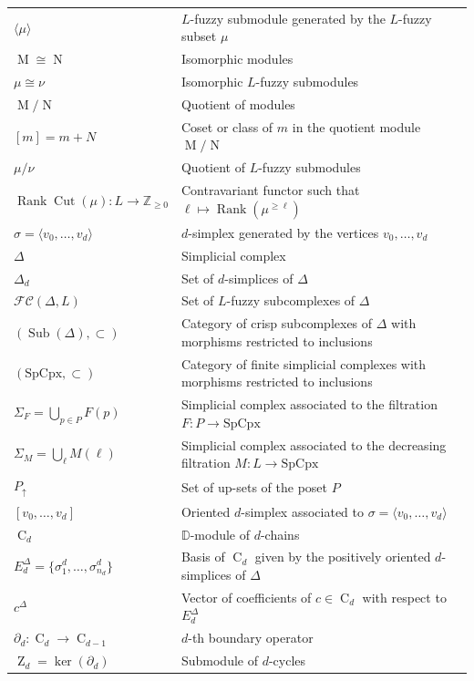 \documentclass[a4paper,10pt]{article}
\newcommand{\bbd}{\mathbb{D}}
\newcommand{\bbz}{\mathbb{Z}}
\newcommand{\calfc}{\mathcal{FC}}
\DeclareMathOperator{\rank}{Rank}
\DeclareMathOperator{\cut}{Cut}
\DeclareMathOperator{\sub}{Sub}
\newcommand{\SpCpx}{\textrm{SpCpx}}
\DeclareMathOperator{\Mo}{M}
\DeclareMathOperator{\No}{N}
\DeclareMathOperator{\Co}{C}
\DeclareMathOperator{\Zo}{Z}
\begin{document}
\begin{longtable}{l|l}
\(\langle \mu \rangle\) & \(L\)-fuzzy submodule generated by the \(L\)-fuzzy subset \(\mu\) \\
\(\Mo \cong \No\) & Isomorphic modules \\
\(\mu \cong \nu\) & Isomorphic \(L\)-fuzzy submodules \\
\(\Mo/\No\) & Quotient of modules \\
\([m]=m + N\) & Coset or class of \(m\) in the quotient module \(\Mo / \No\) \\
\(\mu/\nu\) & Quotient of \(L\)-fuzzy submodules \\
\(\rank\!\cut(\mu): L \to \bbz_{\geq 0}\) & Contravariant functor such that \(\ell \mapsto \rank(\mu^{\geq \ell})\) \\
\(\sigma = \langle v_0,\dots,v_d \rangle\) & \(d\)-simplex generated by the vertices \(v_0,\dots,v_d\) \\
\(\Delta\) & Simplicial complex \\
\(\Delta_d\) & Set of \(d\)-simplices of \(\Delta\) \\
\(\calfc(\Delta,L)\) & Set of \(L\)-fuzzy subcomplexes of \(\Delta\) \\
\((\sub(\Delta),\subset)\) & Category of crisp subcomplexes of \(\Delta\) with morphisms restricted to inclusions \\
\((\SpCpx,\subset)\) & Category of finite simplicial complexes with morphisms restricted to inclusions \\
\(\Sigma_F=\bigcup_{p \in P}F(p)\) & Simplicial complex associated to the filtration \(F: P \to \SpCpx\) \\
\(\Sigma_{M} = \bigcup_{\ell} M(\ell) \) & Simplicial complex associated to the decreasing filtration \(M: L \to \SpCpx\) \\
\(P_\uparrow\) & Set of up-sets of the poset \(P\) \\
\([v_0,\dots,v_d]\) & Oriented \(d\)-simplex associated to \(\sigma = \langle v_0,\dots,v_d \rangle\) \\
\(\Co_d\) & \(\bbd\)-module of \(d\)-chains \\
\(E^{\Delta}_d = \{\sigma^{d}_{1},\dots,\sigma^{d}_{n_d}\}\) & Basis of \(\Co_d\) given by the positively oriented \(d\)-simplices of \(\Delta\) \\
\(c^{\Delta}\) & Vector of coefficients of \(c \in \Co_d\) with respect to \(E^{\Delta}_d\) \\
\(\partial_d: \Co_d \to \Co_{d-1}\) & \(d\)-th boundary operator \\
\(\Zo_d = \ker(\partial_d)\) & Submodule of \(d\)-cycles \\

\end{longtable}
\end{document}
